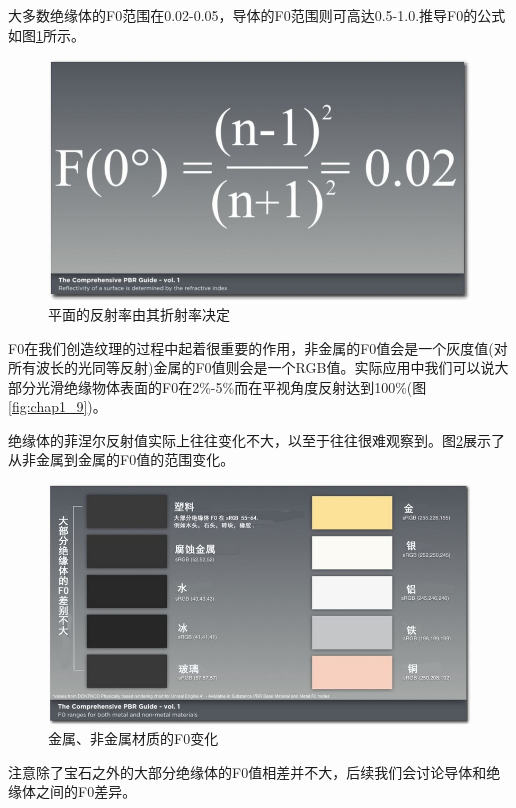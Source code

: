 大多数绝缘体的F0范围在0.02-0.05，导体的F0范围则可高达0.5-1.0.推导F0的公式如图\ref{fig:chap1_10}所示。

\begin{figure}[ht]
    \centering
	\includegraphics[width=\textwidth]{images/chap1_10.jpg}
	\caption{平面的反射率由其折射率决定}
    \label{fig:chap1_10}
\end{figure}

F0在我们创造纹理的过程中起着很重要的作用，非金属的F0值会是一个灰度值(对所有波长的光同等反射)金属的F0值则会是一个RGB值。实际应用中我们可以说大部分光滑绝缘物体表面的F0在2\%-5\%而在平视角度反射达到100\%(图\ref{fig:chap1_9})。

绝缘体的菲涅尔反射值实际上往往变化不大，以至于往往很难观察到。图\ref{fig:chap1_11}展示了从非金属到金属的F0值的范围变化。

\begin{figure}[ht]
    \centering
	\includegraphics[width=\textwidth]{images/chap1_11.jpg}
	\caption{金属、非金属材质的F0变化}
    \label{fig:chap1_11}
\end{figure}

注意除了宝石之外的大部分绝缘体的F0值相差并不大，后续我们会讨论导体和绝缘体之间的F0差异。

